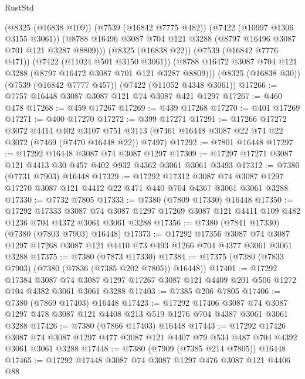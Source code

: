 \begin{lexlean}{RustStd}
\begin{coremodule}
        (@8325 (@16838 @109))
        (@7539 (@16842 @7775 @482))
        (@7422 (@10997 @1306 @3155 @3061))
        (@8788 @16496 @3087 @704 @121 @3288 (@8797 @16496 @3087 @701 @121 @3287 @8809)))
      (@8325 (@16838 @22))
      (@7539 (@16842 @7776 @471))
      (@7422 (@11024 @501 @3150 @3061))
      (@8788 @16472 @3087 @704 @121 @3288 (@8797 @16472 @3087 @701 @121 @3287 @8809)))
    (@8325 (@16838 @30))
    (@7539 (@16842 @7777 @457))
    (@7422 (@11052 @4348 @3061))
@17266 := @7757 @16448 @3087 @3087 @121 @74 @3087 @421 @1297
@17267 := @460 @478
@17268 := @459 @17267
@17269 := @439 @17268
@17270 := @401 @17269
@17271 := @400 @17270
@17272 := @399 @17271
@17291 := @17266
    @17272
    @3072
    @4414
    @402
    @3107
    @751
    @3113
    (@7461 @16448 @3087 @22 @74 @22 @3072 (@7469 (@7470 @16448 @22)) @7497)
@17292 := @7801 @16448
@17297 := @17292 @16448 @3087 @74 @3087 @1297
@17309 := @17297 @17271 @3087 @121 @4413 @30 @457 @402 @932 @4362 @3061 @3061 @3493
@17312 := @7380 (@7731 @7903) @16448
@17329 := @17292
    @17312
    @3087
    @74
    @3087
    @1297
    @17270
    @3087
    @121
    @4412
    @22
    @471
    @440
    @704
    @4367
    @3061
    @3061
    @3288
@17330 := @7732 @7805
@17333 := @7380 (@7809 @17330) @16448
@17350 := @17292
    @17333
    @3087
    @74
    @3087
    @1297
    @17269
    @3087
    @121
    @4411
    @109
    @482
    @1236
    @704
    @4372
    @3061
    @3061
    @3288
@17356 := @7380 (@7841 @17330) (@7380 (@7803 @7903) @16448)
@17373 := @17292
    @17356
    @3087
    @74
    @3087
    @1297
    @17268
    @3087
    @121
    @4410
    @73
    @493
    @1266
    @704
    @4377
    @3061
    @3061
    @3288
@17375 := @7380 (@7873 @17330)
@17384 := @17375 (@7380 (@7833 @7903) (@7380 (@7836 (@7385 @202 @7805)) @16448))
@17401 := @17292
    @17384
    @3087
    @74
    @3087
    @1297
    @17267
    @3087
    @121
    @4409
    @201
    @506
    @1272
    @704
    @4382
    @3061
    @3061
    @3288
@17403 := @7385 @206 @7805
@17406 := @7380 (@7869 @17403) @16448
@17423 := @17292
    @17406
    @3087
    @74
    @3087
    @1297
    @478
    @3087
    @121
    @4408
    @213
    @519
    @1276
    @704
    @4387
    @3061
    @3061
    @3288
@17426 := @7380 (@7866 @17403) @16448
@17443 := @17292
    @17426
    @3087
    @74
    @3087
    @1297
    @477
    @3087
    @121
    @4407
    @79
    @534
    @487
    @704
    @4392
    @3061
    @3061
    @3288
@17448 := @7380 (@7909 (@7385 @214 @7805)) @16448
@17465 := @17292
    @17448
    @3087
    @74
    @3087
    @1297
    @476
    @3087
    @121
    @4406
    @88

\end{coremodule}
\end{lexlean}
